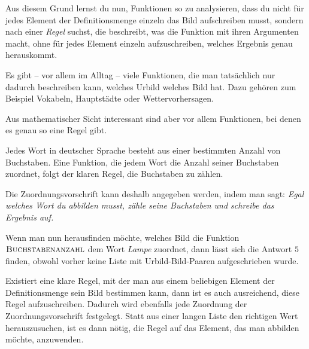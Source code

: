 \documentclass[../../main.tex]{subfiles}
\begin{document}
Aus diesem Grund lernst du nun, Funktionen so zu analysieren, dass du nicht für jedes Element der Definitionsmenge einzeln das Bild aufschreiben musst, sondern nach einer \emph{Regel} suchst, die beschreibt, was die Funktion mit ihren Argumenten macht, ohne für jedes Element einzeln aufzuschreiben, welches Ergebnis genau herauskommt. 

Es gibt -- vor allem im Alltag -- viele Funktionen, die man tatsächlich nur dadurch beschreiben kann, welches Urbild welches Bild hat. Dazu gehören zum Beispiel Vokabeln, Hauptstädte oder Wettervorhersagen.

Aus mathematischer Sicht interessant sind aber vor allem Funktionen, bei denen es genau so eine Regel gibt.

\begin{example}[ex:buchstabenanzahl]{}

    Jedes Wort in deutscher Sprache besteht aus einer bestimmten Anzahl von Buchstaben. Eine Funktion, die jedem Wort die Anzahl seiner Buchstaben zuordnet, folgt der klaren Regel, die Buchstaben zu zählen.
    
    Die Zuordnungsvorschrift kann deshalb angegeben werden, indem man sagt: \emph{Egal welches Wort du abbilden musst, zähle seine Buchstaben und schreibe das Ergebnis auf.} 
    
    Wenn man nun herausfinden möchte, welches Bild die Funktion $\textsc{Buchstabenanzahl}$ dem Wort \emph{Lampe} zuordnet, dann lässt sich die Antwort $5$ finden, obwohl vorher keine Liste mit Urbild-Bild-Paaren aufgeschrieben wurde.
\end{example}

Existiert eine klare Regel, mit der man aus einem beliebigen Element der Definitionsmenge sein Bild bestimmen kann, dann ist es auch ausreichend, diese Regel aufzuschreiben. Dadurch wird ebenfalls jede Zuordnung der Zuordnungsvorschrift festgelegt. Statt aus einer langen Liste den richtigen Wert herauszusuchen, ist es dann nötig, die Regel auf das Element, das man abbilden möchte, anzuwenden.
\end{document}

